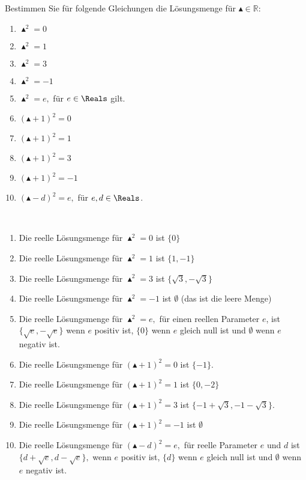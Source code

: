 \documentclass[12pt]{article}
\begin{document}
Bestimmen Sie für folgende Gleichungen die Lösungsmenge für $\blacktriangle \in \mathbb{R}$:
\begin{enumerate}[2col, label=\alph*)]
\item $\blacktriangle^2 = 0$
\item $\blacktriangle^2 = 1$
\item $\blacktriangle^2 = 3$
\item $\blacktriangle^2 = -1$
\item $\blacktriangle^2 = e,$ für $e\in \Reals$ gilt.
\item $(\blacktriangle+1)^2 = 0$
\item $(\blacktriangle+1)^2 = 1$
\item $(\blacktriangle +1)^2 = 3$
\item $(\blacktriangle +1)^2 = -1$
\item $(\blacktriangle - d)^2 = e,$ für $e, d \in \Reals$.
\end{enumerate}\hfill\\
\begin{solution}
\begin{enumerate}[2col, label=\alph*)]
\item Die reelle Lösungsmenge für $\blacktriangle^2 = 0$ ist $\{0\}$
\item Die reelle Lösungsmenge für $\blacktriangle^2 = 1$ ist $\{1,-1\}$
\item Die reelle Lösungsmenge für $\blacktriangle^2 = 3$ ist $\{\sqrt{3},-\sqrt{3}\}$
\item Die reelle Lösungsmenge für $\blacktriangle^2 = -1$ ist $\emptyset$ (das ist die leere Menge)
\item Die reelle Lösungsmenge für $\blacktriangle^2 = e,$ für einen reellen Parameter $e$, ist $\{\sqrt{e},-\sqrt{e}\}$ wenn $e$ positiv ist, $\{0\}$ wenn $e$ gleich null ist und $\emptyset$ wenn $e$ negativ ist.
\item Die reelle Lösungsmenge für $(\blacktriangle+1)^2 = 0$ ist $\{-1\}.$
\item Die reelle Lösungsmenge für $(\blacktriangle+1)^2 = 1$ ist $\{0, -2\}$
\item Die reelle Lösungsmenge für $(\blacktriangle +1)^2 = 3$ ist $\{-1 + \sqrt{3}, -1 - \sqrt{3} \}.$
\item Die reelle Lösungsmenge für $(\blacktriangle +1)^2 = -1$ ist $\emptyset$
\item Die reelle Lösungsmenge für $(\blacktriangle - d)^2 = e,$ für reelle Parameter $e$ und $d$ ist $\{d+\sqrt{e}, d-\sqrt{e} \},$ wenn $e$ positiv ist, $\{d\}$ wenn $e$ gleich null ist und $\emptyset$ wenn $e$ negativ ist.
\end{enumerate}\hfill\\
\end{solution}
\newpage
\end{document}
